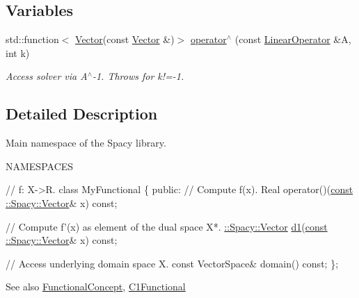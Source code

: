 \subsection*{Variables}
\begin{DoxyCompactItemize}
\item 
\hypertarget{namespaceSpacy_a39b7357abb0410ba6e6c640029425400}{}std\+::function$<$ \hyperlink{classSpacy_1_1Vector}{Vector}(const \hyperlink{classSpacy_1_1Vector}{Vector} \&)$>$ \hyperlink{namespaceSpacy_a39b7357abb0410ba6e6c640029425400}{operator$^\wedge$} (const \hyperlink{classSpacy_1_1LinearOperator}{Linear\+Operator} \&A, int k)\label{namespaceSpacy_a39b7357abb0410ba6e6c640029425400}

\begin{DoxyCompactList}\small\item\em Access solver via A$^\wedge$-\/1. Throws for k!=-\/1. \end{DoxyCompactList}\end{DoxyCompactItemize}


\subsection{Detailed Description}
Main namespace of the Spacy library. 

N\+A\+M\+E\+S\+P\+A\+C\+E\+S

\label{namespaceSpacy_C1FunctionalConceptAnchor}%
\hypertarget{namespaceSpacy_C1FunctionalConceptAnchor}{}%
 
\begin{DoxyCode}
\textcolor{comment}{// f: X->R.}
\textcolor{keyword}{class }MyFunctional
\{
\textcolor{keyword}{public}:
  \textcolor{comment}{// Compute f(x).}
  Real operator()(\hyperlink{group__VectorSpaceGroup_gafda42fd5aa3f7597a42b9831bf4dfd07}{const ::Spacy::Vector}& x) \textcolor{keyword}{const};

  \textcolor{comment}{// Compute f'(x) as element of the dual space X*.}
  \hyperlink{classSpacy_1_1Vector}{::Spacy::Vector} \hyperlink{namespaceSpacy_ab6646eb7068eb9f1369e639cf0b620a2}{d1}(\hyperlink{group__VectorSpaceGroup_gafda42fd5aa3f7597a42b9831bf4dfd07}{const ::Spacy::Vector}& x) \textcolor{keyword}{const};

  \textcolor{comment}{// Access underlying domain space X.}
  \textcolor{keyword}{const} VectorSpace& domain() \textcolor{keyword}{const};
\};
\end{DoxyCode}


\begin{DoxySeeAlso}{See also}
\hyperlink{group__ConceptGroup_gae45328d2e01ef6c8e5d948b69fda385f}{Functional\+Concept}, \hyperlink{classSpacy_1_1C1Functional}{C1\+Functional} 
\end{DoxySeeAlso}


